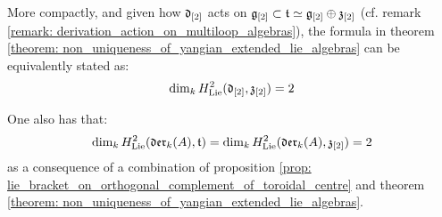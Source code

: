         \begin{corollary}
            More compactly, and given how $\mathfrak{d}_{[2]}$ acts on $\mathfrak{g}_{[2]} \subset \mathfrak{t} \simeq \mathfrak{g}_{[2]} \oplus \mathfrak{z}_{[2]}$ (cf. remark \ref{remark: derivation_action_on_multiloop_algebras}), the formula in theorem \ref{theorem: non_uniqueness_of_yangian_extended_lie_algebras} can be equivalently stated as:
                $$\dim_{k} H^2_{\mathrm{Lie}}(\mathfrak{d}_{[2]}, \mathfrak{z}_{[2]}) = 2$$
        \end{corollary}
        \begin{corollary}
            One also has that:
                $$\dim_{k} H^2_{\mathrm{Lie}}(\mathfrak{der}_{k}(A), \mathfrak{t}) = \dim_{k} H^2_{\mathrm{Lie}}(\mathfrak{der}_{k}(A), \mathfrak{z}_{[2]}) = 2$$
            as a consequence of a combination of proposition \ref{prop: lie_bracket_on_orthogonal_complement_of_toroidal_centre} and theorem \ref{theorem: non_uniqueness_of_yangian_extended_lie_algebras}.
        \end{corollary}

